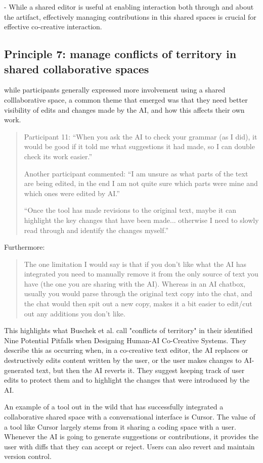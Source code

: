 - While a shared editor is useful at enabling interaction both through and about the artifact, effectively managing contributions in this shared spaces is crucial for effective co-creative interaction. 

\subsection{Principle 7: manage conflicts of territory in shared collaborative spaces}

while participants generally expressed more involvement using a shared colllaborative space, a common theme that emerged was that they need better visibility of edits and changes made by the AI, and how this affects their own work. 
\begin{quote}
Participant 11: “When you ask the AI to check your grammar (as I did), it would be good if it told me what suggestions it had made, so I can double check its work easier.”

Another participant commented: “I am unsure as what parts of the text are being edited, in the end I am not quite sure which parts were mine and which ones were edited by AI.”

“Once the tool has made revisions to the original text, maybe it can highlight the key changes that have been made... otherwise I need to slowly read through and identify the changes myself.”
\end{quote}
Furthermore:
\begin{quote}
The one limitation I would say is that if you don't like what the AI has integrated you need to manually remove it from the only source of text you have (the one you are sharing with the AI). Whereas in an AI chatbox, usually you would parse through the original text copy into the chat, and the chat would then spit out a new copy, makes it a bit easier to edit/cut out any additions you don't like.
\end{quote}
This highlights what Buschek et al. \cite{Buschek2021-ks} call "conflicts of territory" in their identified Nine Potential Pitfalls when Designing Human-AI Co-Creative Systems. They describe this as occurring when, in a co-creative text editor, the AI replaces or destructively edits content written by the user, or the user makes changes to AI-generated text, but then the AI reverts it. They suggest keeping track of user edits to protect them and to highlight the changes that were introduced by the AI.

An example of a tool out in the wild that has successfully integrated a collaborative shared space with a conversational interface is Cursor. The value of a tool like Cursor largely stems from it sharing a coding space with a user. Whenever the AI is going to generate suggestions or contributions, it provides the user with diffs that they can accept or reject. Users can also revert and maintain version control.

